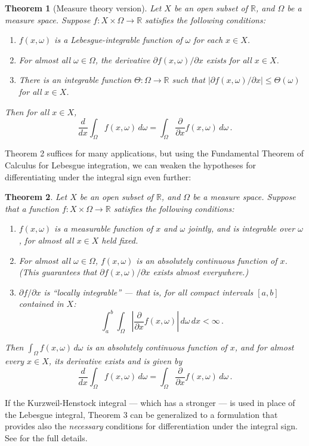 \documentclass[12pt]{article}
\newcommand{\real}{\mathbb{R}}
\providecommand{\absW}[1]{\left\lvert#1\right\rvert}
\providecommand{\ddx}[1]{\frac{d #1}{dx}}
\providecommand{\pdx}[1]{\frac{\partial #1}{\partial x}}
\providecommand{\ipdx}[1]{\partial #1 / \partial x}
\newtheorem{thm}{Theorem}
\begin{document}
\begin{thm}[Measure theory version]\label{thm:meas}
Let $X$ be an open subset of $\real$, and $\Omega$ be a measure space.
Suppose $f\colon X \times \Omega \to \real$ satisfies
the following conditions:
\begin{enumerate}
\item
$f(x, \omega)$ is a Lebesgue-integrable function of $\omega$ for each $x \in X$.
\item
For almost all 
$\omega \in \Omega$, the derivative $\ipdx{f(x,\omega)}$ exists for all $x \in X$.
\item
There is an integrable function $\Theta\colon \Omega \to \real$ such that 
$\absW{\ipdx{f(x,\omega)}} \leq \Theta(\omega)$
for all $x \in X$.
\end{enumerate}
Then for all $x \in X$,
\[
\ddx{} \int_\Omega f(x, \omega) \, d\omega = \int_\Omega 
\pdx{} f(x,\omega) \, d\omega\,.
\]
\end{thm}

Theorem 2 suffices for many applications,
but using the Fundamental Theorem of Calculus for Lebesgue integration,
we can weaken the hypotheses for differentiating under
the integral sign even further:

\begin{thm}
Let $X$ be an open subset of $\real$, and $\Omega$ be a measure space.
Suppose that a function $f\colon X \times \Omega \to \real$ satisfies
the following conditions:
\begin{enumerate}
\item
$f(x,\omega)$ is a measurable function of $x$ and $\omega$
jointly, and is integrable over $\omega$, for almost all $x \in X$ held fixed.
\item
For almost all 
$\omega \in \Omega$, $f(x,\omega)$ is an absolutely continuous
function of $x$.  (This guarantees that $\ipdx{f(x,\omega)}$ exists
almost everywhere.)
\item
$\ipdx{f}$ is ``locally integrable'' --- that is, for
all compact intervals $[a,b]$ contained in $X$:
\[
\int_{a}^b \int_\Omega \absW{ \pdx{} f(x,\omega)} \, d\omega \, dx < \infty\,.
\]
\end{enumerate}
Then $\int_\Omega f(x,\omega) \, d\omega$ is an absolutely continuous function of $x$, and for almost every $x \in X$, its derivative exists
and is given by
\[
\ddx{} \int_\Omega f(x, \omega) \, d\omega = \int_\Omega 
\pdx{} f(x,\omega) \, d\omega\,.
\]
\end{thm}

If the Kurzweil-Henstock integral --- which has 
a stronger 
 ---
is used in place
of the Lebesgue integral,
Theorem 3 can be generalized to a formulation
that provides also the \emph{necessary} 
conditions for differentiation under the integral sign.
See \cite{Talvila} for the full details.
\end{document}
